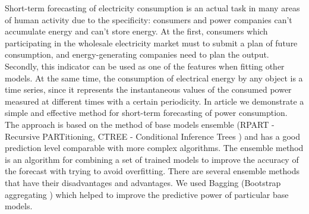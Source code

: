 \documentclass[60x84/16,8pt]{ittmm}
\begin{document}





\begin{altabstract}
Short-term forecasting of electricity consumption is an actual task in many
areas of human activity due to the specificity: consumers and power companies
can't accumulate energy and can't store energy. At the first, consumers which
participating in the wholesale electricity market must to submit a plan of
future consumption, and energy-generating companies need to plan the output.
Secondly, this indicator can be used as one of the features when fitting other
models. At the same time, the consumption of electrical energy by any object is
a time series, since it represents the instantaneous values ​​of the consumed
power measured at different times with a certain periodicity. In article we
demonstrate a simple and effective method for short-term forecasting of power
consumption. The approach is based on the method of base models ensemble (RPART
- Recursive PARTitioning, CTREE - Conditional Inference Trees
\cite{BreimanEtAl}) and has a good prediction level comparable with more complex
algorithms. The ensemble method is an algorithm for combining a set of trained
models to improve the accuracy of the forecast with trying to avoid overfitting.
There are several ensemble methods that have their disadvantages and advantages.
We used Bagging (Bootstrap aggregating \cite{Breiman1996}) which helped to
improve the predictive power of particular base models.
\end{altabstract}
\end{document}
